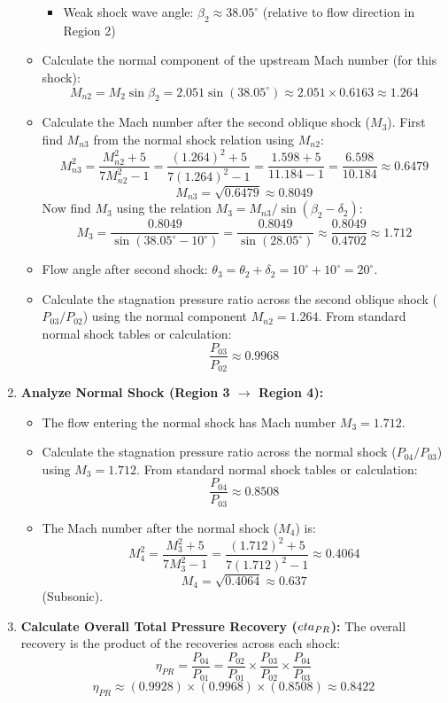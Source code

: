 \begin{enumerate}
\begin{itemize}
    \begin{itemize}
    \tightlist
    \item
      Weak shock wave angle: \(\beta_2 \approx 38.05^\circ\) (relative
      to flow direction in Region 2)
    \end{itemize}
  \item
    Calculate the normal component of the upstream Mach number (for this
    shock):
    \[ M_{n2} = M_2 \sin\beta_2 = 2.051 \sin(38.05^\circ) \approx 2.051 \times 0.6163 \approx 1.264 \]
  \item
    Calculate the Mach number after the second oblique shock (\(M_3\)).
    First find \(M_{n3}\) from the normal shock relation using
    \(M_{n2}\):
    \[ M_{n3}^2 = \frac{M_{n2}^2 + 5}{7M_{n2}^2 - 1} = \frac{(1.264)^2 + 5}{7(1.264)^2 - 1} = \frac{1.598 + 5}{11.184 - 1} = \frac{6.598}{10.184} \approx 0.6479 \]
    \[ M_{n3} = \sqrt{0.6479} \approx 0.8049 \] Now find \(M_3\) using
    the relation \(M_3 = M_{n3} / \sin(\beta_2 - \delta_2)\):
    \[ M_3 = \frac{0.8049}{\sin(38.05^\circ - 10^\circ)} = \frac{0.8049}{\sin(28.05^\circ)} \approx \frac{0.8049}{0.4702} \approx 1.712 \]
  \item
    Flow angle after second shock:
    \(\theta_3 = \theta_2 + \delta_2 = 10^\circ + 10^\circ = 20^\circ\).
  \item
    Calculate the stagnation pressure ratio across the second oblique
    shock (\(P_{03}/P_{02}\)) using the normal component
    \(M_{n2}=1.264\). From standard normal shock tables or calculation:
    \[ \frac{P_{03}}{P_{02}} \approx 0.9968 \]
  \end{itemize}
\item
  \textbf{Analyze Normal Shock (Region 3 \(\to\) Region 4):}

  \begin{itemize}
  \tightlist
  \item
    The flow entering the normal shock has Mach number \(M_3 = 1.712\).
  \item
    Calculate the stagnation pressure ratio across the normal shock
    (\(P_{04}/P_{03}\)) using \(M_3=1.712\). From standard normal shock
    tables or calculation: \[ \frac{P_{04}}{P_{03}} \approx 0.8508 \]
  \item
    The Mach number after the normal shock (\(M_4\)) is:
    \[ M_4^2 = \frac{M_3^2 + 5}{7M_3^2 - 1} = \frac{(1.712)^2 + 5}{7(1.712)^2 - 1} \approx 0.4064 \]
    \[ M_4 = \sqrt{0.4064} \approx 0.637 \] (Subsonic).
  \end{itemize}
\item
  \textbf{Calculate Overall Total Pressure Recovery (\(\\eta_{PR}\)):}
  The overall recovery is the product of the recoveries across each
  shock:
  \[ \eta_{PR} = \frac{P_{04}}{P_{01}} = \frac{P_{02}}{P_{01}} \times \frac{P_{03}}{P_{02}} \times \frac{P_{04}}{P_{03}} \]
  \[ \eta_{PR} \approx (0.9928) \times (0.9968) \times (0.8508) \approx 0.8422 \]
\end{enumerate}

